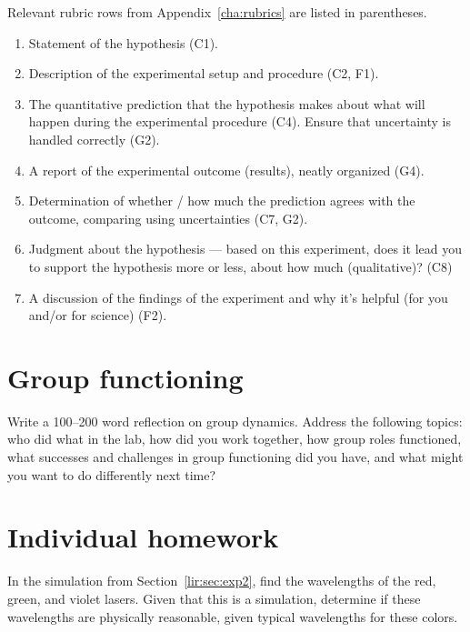 Relevant rubric rows from Appendix~\ref{cha:rubrics} are listed in parentheses.

\begin{enumerate}
	\item Statement of the hypothesis (C1).

	\item Description of the experimental setup and procedure (C2, F1).
	
	\item The quantitative prediction that the hypothesis makes about what will happen during the experimental procedure (C4). Ensure that uncertainty is handled correctly (G2).
	
	\item A report of the experimental outcome (results), neatly organized (G4).
	
	\item Determination of whether / how much the prediction agrees with the outcome, comparing using uncertainties (C7, G2).
	
	\item Judgment about the hypothesis --- based on this experiment, does it lead you to support the hypothesis more or less, about how much (qualitative)? (C8)
	
	\item A discussion of the findings of the experiment and why it's helpful (for you and/or for science) (F2).
\end{enumerate}

\section{Group functioning}

\begin{steps}
	\item Write a 100--200 word reflection on group dynamics. Address the following topics: who did what in the lab, how did you work together, how group roles functioned, what successes and challenges in group functioning did you have, and what might you want to do differently next time?
\end{steps}

\section{Individual homework}

In the simulation from Section\ \ref{lir:sec:exp2}, find the wavelengths of the red, green, and violet lasers. Given that this is a simulation, determine if these wavelengths are physically reasonable, given typical wavelengths for these colors.

